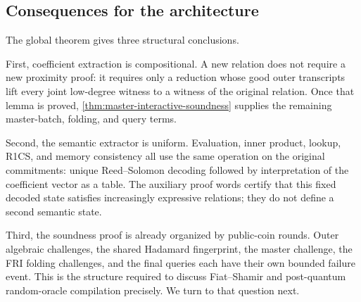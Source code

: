 \subsection{Consequences for the architecture}
\label{sec:global-soundness-consequences}

The global theorem gives three structural conclusions.

First, coefficient extraction is compositional.  A new relation does not require a new proximity proof: it requires only a reduction whose good outer transcripts lift every joint low-degree witness to a witness of the original relation.  Once that lemma is proved, \cref{thm:master-interactive-soundness} supplies the remaining master-batch, folding, and query terms.

Second, the semantic extractor is uniform.  Evaluation, inner product, lookup, R1CS, and memory consistency all use the same operation on the original commitments: unique Reed--Solomon decoding followed by interpretation of the coefficient vector as a table.  The auxiliary proof words certify that this fixed decoded state satisfies increasingly expressive relations; they do not define a second semantic state.

Third, the soundness proof is already organized by public-coin rounds.  Outer algebraic challenges, the shared Hadamard fingerprint, the master challenge, the FRI folding challenges, and the final queries each have their own bounded failure event.  This is the structure required to discuss Fiat--Shamir and post-quantum random-oracle compilation precisely.  We turn to that question next.
